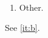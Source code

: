 \documentclass{article}
\begin{document}
\begin{enumerate}
\item[\refstepcounter{enumi}\label{it:b}B)] Other.
\end{enumerate}
See \ref{it:b}.
\end{document}
